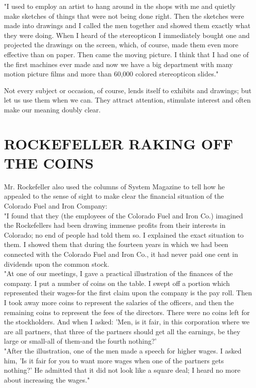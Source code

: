 \documentclass[10pt]{article}
\begin{document}
"I used to employ an artist to hang around in the shops with me and quietly make sketches of things that were not being done right. Then the sketches were made into drawings and I called the men together and showed them exactly what they were doing. When I heard of the stereopticon I immediately bought one and projected the drawings on the screen, which, of course, made them even more effective than on paper. Then came the moving picture. I think that I had one of the first machines ever made and now we have a big department with many motion picture films and more than 60,000 colored stereopticon slides."

Not every subject or occasion, of course, lends itself to exhibits and drawings; but let us use them when we can. They attract attention, stimulate interest and often make our meaning doubly clear.

\section*{ROCKEFELLER RAKING OFF THE COINS}
Mr. Rockefeller also used the columns of System Magazine to tell how he appealed to the sense of sight to make clear the financial situation of the Colorado Fuel and Iron Company:\\
"I found that they (the employees of the Colorado Fuel and Iron Co.) imagined the Rockefellers had been drawing immense profits from their interests in Colorado; no end of people had told them so. I explained the exact situation to them. I showed them that during the fourteen years in which we had been connected with the Colorado Fuel and Iron Co., it had never paid one cent in dividends upon the common stock.\\
"At one of our meetings, I gave a practical illustration of the finances of the company. I put a number of coins on the table. I swept off a portion which represented their wages-for the first claim upon the company is the pay roll. Then I took away more coins to represent the salaries of the officers, and then the remaining coins to represent the fees of the directors. There were no coins left for the stockholders. And when I asked: 'Men, is it fair, in this corporation where we are all partners, that three of the partners should get all the earnings, be they large or small-all of them-and the fourth nothing?'\\
"After the illustration, one of the men made a speech for higher wages. I asked him, 'Is it fair for you to want more wages when one of the partners gets nothing?' He admitted that it did not look like a square deal; I heard no more about increasing the wages."
\end{document}
